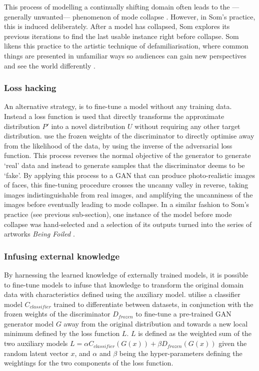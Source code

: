 This process of modelling a continually shifting domain often leads to the ---generally unwanted--- phenomenon of mode collapse \citep{thanh2020catastrophic}. 
However, in Som's practice, this is induced deliberately. After a model has collapsed, Som explores its previous iterations to find the last usable instance right before collapse. 
Som likens this practice to the artistic technique of defamiliarisation, where common things are presented in unfamiliar ways so audiences can gain new perspectives and see the world differently \citep{som2021personal}.

\subsubsection{Loss hacking} 

An alternative strategy, is to fine-tune a model without any training data. 
Instead a loss function is used that directly transforms the approximate distribution $P'$ into a novel distribution $U$ without requiring any other target distribution. 
\citet{broad2020amplifying} use the frozen weights of the discriminator to directly optimise away from the likelihood of the data, by using the inverse of the adversarial loss function. 
This process reverses the normal objective of the generator to generate `real' data and instead to generate samples that the discriminator deems to be `fake'. 
By applying this process to a GAN that can produce photo-realistic images of faces, this fine-tuning procedure crosses the uncanny valley in reverse, taking images indistinguishable from real images, and amplifying the uncanniness of the images before eventually leading to mode collapse. 
In a similar fashion to Som's practice (see previous sub-section), one instance of the model before mode collapse was hand-selected and a selection of its outputs turned into the series of artworks \textit{Being Foiled} \citep{broad2020being}.

\subsubsection{Infusing external knowledge} 

By harnessing the learned knowledge of externally trained models, it is possible to fine-tune models to infuse that knowledge to transform the original domain data with characteristics defined using the auxiliary model. 
\citet{broad2019transforming} utilise a classifier model $C_{classifier}$ trained to differentiate between datasets, in conjunction with the frozen weights of the discriminator $D_{frozen}$ to fine-tune a pre-trained GAN generator model $G$ away from the original distribution and towards a new local minimum defined by the loss function $L$. $L$ is defined as the weighted sum of the two auxiliary models $L = \alpha C_{classifier}(G(x)) + \beta D_{frozen}(G(x))$ given the random latent vector $x$, and $\alpha$ and $\beta$ being the hyper-parameters defining the weightings for the two components of the loss function. 

